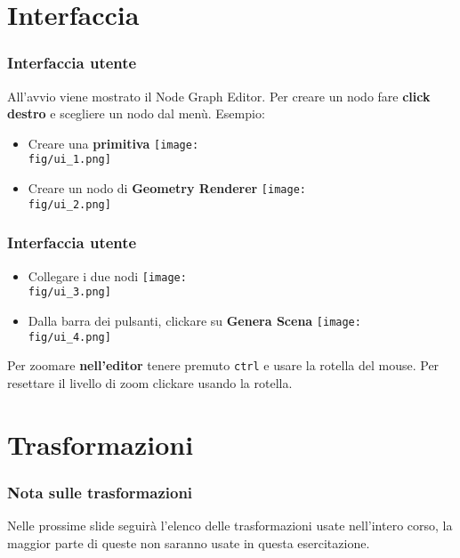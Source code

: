 \documentclass{beamer}
\newcommand{\fig}{figures}
\begin{document}
\section{Interfaccia}

\begin{frame}
\frametitle{Interfaccia utente}
All'avvio viene mostrato il Node Graph Editor.
Per creare un nodo fare \textbf{click destro} e scegliere un nodo dal men\`u.
Esempio:
\begin{itemize}
\item Creare una \textbf{primitiva}
\texttt{[image: \\fig/ui\_1.png]}
\item Creare un nodo di \textbf{Geometry Renderer}
\texttt{[image: \\fig/ui\_2.png]}
\end{itemize}
\end{frame}

\begin{frame}
\frametitle{Interfaccia utente}
\centering
\begin{itemize}
\item Collegare i due nodi
\texttt{[image: \\fig/ui\_3.png]}
\item Dalla barra dei pulsanti, clickare su \textbf{Genera Scena}
\texttt{[image: \\fig/ui\_4.png]}
\end{itemize}
\vspace{0.5cm}
Per zoomare \textbf{nell'editor} tenere premuto \texttt{ctrl} e usare la rotella del mouse.
Per resettare il livello di zoom clickare usando la rotella.
\end{frame}

\section{Trasformazioni}
\begin{frame}
\frametitle{Nota sulle trasformazioni}
Nelle prossime slide seguir\`a l'elenco delle trasformazioni usate
nell'intero corso, la maggior parte di queste non saranno usate in questa esercitazione.
\end{frame}


\end{document}
